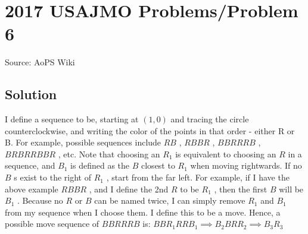 \documentclass[12pt]{article}
\begin{document}
\section*{{2017 USAJMO Problems/Problem 6}}
Source: AoPS Wiki

\subsection*{Solution}
I define a sequence to be, starting at $(1,0)$ and tracing the circle counterclockwise, and writing the color of the points in that order - either R or B. For example, possible sequences include $RB$ , $RBBR$ , $BBRRRB$ , $BRBRRBBR$ , etc.
Note that choosing an $R_1$ is equivalent to choosing an $R$ in a sequence, and $B_1$ is defined as the $B$ closest to $R_1$ when moving rightwards. If no $B$ s exist to the right of $R_1$ , start from the far left. For example, if I have the above example $RBBR$ , and I define the 2nd $R$ to be $R_1$ , then the first $B$ will be $B_1$ . Because no $R$ or $B$ can be named twice, I can simply remove $R_1$ and $B_1$ from my sequence when I choose them. I define this to be a move. Hence, a possible move sequence of $BBRRRB$ is: $BBR_1RRB_1\implies B_2BRR_2\implies B_3R_3$
\end{document}
